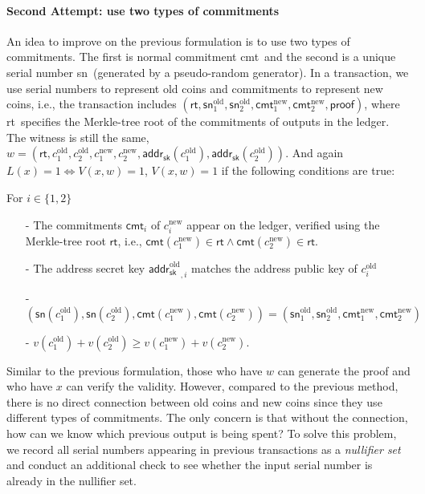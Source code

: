 \documentclass[a4paper]{article}
\newcommand{\cmt}{\textsf{cmt}}
\newcommand{\sn}{\textsf{sn}}
\newcommand{\adsk}{\textsf{addr}_{\textsf{sk}}}
\newcommand{\adpkold}{\textsf{addr}^{\text{old}}_{\textsf{pk}}}
\newcommand{\adskold}{\textsf{addr}^{\text{old}}_{\textsf{sk}}}
\newcommand{\rt}{\textsf{rt}}
\newcommand{\pf}{\textsf{proof}}
\begin{document}
\paragraph{Second Attempt: use two types of commitments} An idea to improve on the previous formulation is to use two types of commitments. The first is normal commitment \cmt\ and the second is a unique serial number \sn\  (generated by a pseudo-random generator).  In a transaction, we use serial numbers to represent old coins and commitments to represent new coins, i.e., the transaction includes $(\rt, \sn_1^{\text{old}}, \sn_2^{\text{old}}, \cmt_1^{\text{new}}, \cmt_2^{\text{new}}, \pf)$, where \rt\ specifies the Merkle-tree root of the commitments of outputs in the ledger. The witness is still the same, $w = (\rt, c_1^{\text{old}}, c_2^{\text{old}}, c_1^{\text{new}}, c_2^{\text{new}}, \adsk(c_1^{\text{old}}), \adsk(c_2^{\text{old}}))$. And again $L(x)=1\iff V(x,w)=1$, $V(x,w)=1$ if the following conditions are true:

For $i\in \{1,2\}$
\begin{itemize}
    \item [-] The commitments $\cmt_i$ of $c_i^{\text{new}}$ appear on the ledger, verified using the Merkle-tree root $\rt$, i.e., $\cmt(c_1^{\text{new}}) \in \rt \land \cmt(c_2^{\text{new}}) \in \rt$.
    \item [-] The address secret key ${\adskold}_{,i}$ matches the address public key of $c_i^{\text{old}}$ %
    \item [-] $(\sn(c_1^{\text{old}}), \sn(c_2^{\text{old}}), \cmt(c_1^{\text{new}}), \cmt(c_2^{\text{new}})) = (\sn_1^{\text{old}}, \sn_2^{\text{old}}, \cmt_1^{\text{new}}, \cmt_2^{\text{new}})$
    \item [-] $v(c_1^{\text{old}}) + v(c_2^{\text{old}}) \ge v(c_1^{\text{new}}) + v(c_2^{\text{new}})$. 
\end{itemize}

Similar to the previous formulation, those who have $w$ can generate the proof and who have $x$ can verify the validity. However, compared to the previous method, there is no direct connection between old coins and new coins since they use different types of commitments. The only concern is that without the connection, how can we know which previous output is being spent? To solve this problem, we record all serial numbers appearing in previous transactions as a {\em nullifier set} and conduct an additional check to see whether the input serial number is already in the nullifier set.
\end{document}

